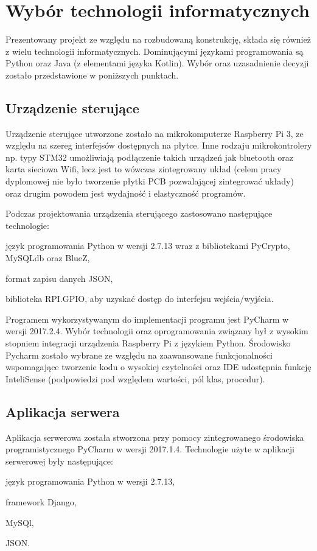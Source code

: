 \newpage\section{Wybór technologii informatycznych} \label{sec:technologie}
Prezentowany projekt ze względu na rozbudowaną konstrukcję, składa się również z wielu technologii informatycznych. Dominującymi językami programowania są Python oraz Java (z elementami języka Kotlin). Wybór oraz uzasadnienie decyzji zostało przedstawione w poniższych punktach.

\subsection{Urządzenie sterujące}
Urządzenie sterujące utworzone zostało na mikrokomputerze Raspberry Pi 3, ze względu na szereg interfejsów dostępnych na płytce. Inne rodzaju mikrokontrolery np. typy STM32 umożliwiają podłączenie takich urządzeń jak bluetooth oraz karta sieciowa Wifi, lecz jest to wówczas zintegrowany układ (celem pracy dyplomowej nie było tworzenie płytki PCB pozwalającej zintegrować układy) oraz drugim powodem jest wydajność i elastyczność programów. 

Podczas projektowania urządzenia sterującego zastosowano następujące technologie:
\begin{itemize*}
	\item język programowania Python w wersji 2.7.13 wraz z bibliotekami PyCrypto, MySQLdb oraz BlueZ,
	\item format zapisu danych JSON,
	\item biblioteka RPI.GPIO, aby uzyskać dostęp do interfejsu wejścia/wyjścia.
\end{itemize*}

Programem wykorzystywanym do implementacji programu jest PyCharm w wersji 2017.2.4. Wybór technologii oraz oprogramowania związany był z wysokim stopniem integracji urządzenia Raspberry Pi z językiem Python. Środowisko Pycharm zostało wybrane ze względu na zaawansowane funkcjonalności wspomagające tworzenie kodu o wysokiej czytelności oraz IDE udostępnia funkcję InteliSense (podpowiedzi pod względem wartości, pól klas, procedur).

\newpage
\subsection{Aplikacja serwera}
Aplikacja serwerowa została stworzona przy pomocy zintegrowanego środowiska programistycznego PyCharm w wersji 2017.1.4. Technologie użyte w aplikacji serwerowej były następujące:
\begin{itemize*}
	\item język programowania Python w wersji 2.7.13,
	\item framework Django,
	\item MySQl,
	\item JSON.
\end{itemize*}


